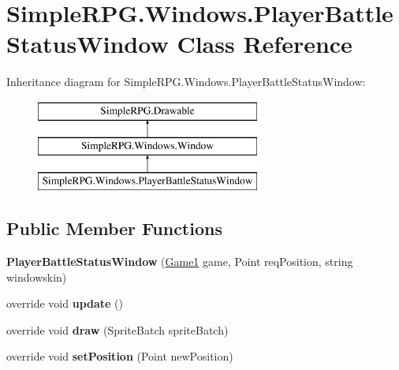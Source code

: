 \hypertarget{class_simple_r_p_g_1_1_windows_1_1_player_battle_status_window}{\section{Simple\-R\-P\-G.\-Windows.\-Player\-Battle\-Status\-Window Class Reference}
\label{class_simple_r_p_g_1_1_windows_1_1_player_battle_status_window}
}
Inheritance diagram for Simple\-R\-P\-G.\-Windows.\-Player\-Battle\-Status\-Window\-:\begin{figure}[H]
\begin{center}
\leavevmode
\includegraphics[height=3.000000cm]{class_simple_r_p_g_1_1_windows_1_1_player_battle_status_window}
\end{center}
\end{figure}
\subsection*{Public Member Functions}
\begin{DoxyCompactItemize}
\item 
\hypertarget{class_simple_r_p_g_1_1_windows_1_1_player_battle_status_window_a0af608f6be2eeb5ffd0e5667c215ce9a}{{\bfseries Player\-Battle\-Status\-Window} (\hyperlink{class_simple_r_p_g_1_1_game1}{Game1} game, Point req\-Position, string windowskin)}\label{class_simple_r_p_g_1_1_windows_1_1_player_battle_status_window_a0af608f6be2eeb5ffd0e5667c215ce9a}

\item 
\hypertarget{class_simple_r_p_g_1_1_windows_1_1_player_battle_status_window_a24e6f06bae4c4aef79a4a935ee2536ab}{override void {\bfseries update} ()}\label{class_simple_r_p_g_1_1_windows_1_1_player_battle_status_window_a24e6f06bae4c4aef79a4a935ee2536ab}

\item 
\hypertarget{class_simple_r_p_g_1_1_windows_1_1_player_battle_status_window_abbb624620fe13be8267c0ab4ad440d95}{override void {\bfseries draw} (Sprite\-Batch sprite\-Batch)}\label{class_simple_r_p_g_1_1_windows_1_1_player_battle_status_window_abbb624620fe13be8267c0ab4ad440d95}

\item 
\hypertarget{class_simple_r_p_g_1_1_windows_1_1_player_battle_status_window_af33b19cf7d58730968deb5df2599a0e1}{override void {\bfseries set\-Position} (Point new\-Position)}\label{class_simple_r_p_g_1_1_windows_1_1_player_battle_status_window_af33b19cf7d58730968deb5df2599a0e1}

\end{DoxyCompactItemize}
